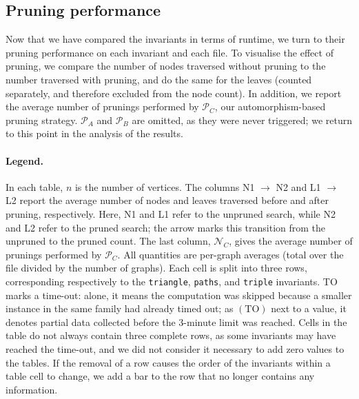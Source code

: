 \subsection{Pruning performance}

Now that we have compared the invariants in terms of runtime, we turn to their pruning performance on each invariant and each file. To visualise the effect of pruning, we compare the number of nodes traversed without pruning to the number traversed with pruning, and do the same for the leaves (counted separately, and therefore excluded from the node count). In addition, we report the average number of prunings performed by $\mathcal{P}_C$, our automorphism-based pruning strategy. $\mathcal{P}_A$ and $\mathcal{P}_B$ are omitted, as they were never triggered; we return to this point in the analysis of the results.
\newpage

\paragraph{Legend.} In each table, $n$ is the number of vertices. The columns
N1 $\rightarrow$ N2 and L1 $\rightarrow$ L2 report the average number of nodes and leaves
traversed before and after pruning, respectively. Here, N1 and L1 refer to the
unpruned search, while N2 and L2 refer to the pruned search; the arrow marks this transition from the unpruned to the pruned count. The last column, $\mathcal{N}_C$, gives the average number of prunings performed by $\mathcal{P}_C$. All quantities are per-graph averages (total over the file divided by the number of graphs). Each cell is split into three rows, corresponding respectively to the \texttt{triangle}, \texttt{paths}, and \texttt{triple} invariants. $\mathrm{TO}$ marks a time-out: alone, it means the computation was skipped because a smaller instance in the same family had already timed out; as $(\mathrm{TO})$ next to a value, it denotes partial data collected before the 3-minute limit was reached. Cells in the table do not always contain three complete rows, as some invariants may have reached the time-out, and we did not consider it necessary to add zero values to the tables. If the removal of a row causes the order of the invariants within a table cell to change, we add a bar to the row that no
longer contains any information.

